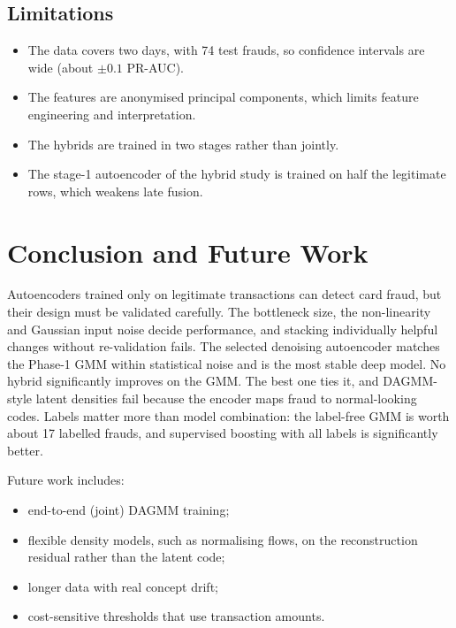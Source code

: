 \documentclass[12pt]{article}
\begin{document}
\subsection{Limitations}
\begin{itemize}
\item The data covers two days, with 74 test frauds, so confidence intervals are wide (about $\pm0.1$ PR-AUC).
\item The features are anonymised principal components, which limits feature engineering and interpretation.
\item The hybrids are trained in two stages rather than jointly.
\item The stage-1 autoencoder of the hybrid study is trained on half the legitimate rows, which weakens late fusion.
\end{itemize}

\section{Conclusion and Future Work}\label{sec:concl}
Autoencoders trained only on legitimate transactions can detect card fraud, but their design must be validated
carefully. The bottleneck size, the non-linearity and Gaussian input noise decide performance, and stacking
individually helpful changes without re-validation fails. The selected denoising autoencoder matches the Phase-1 GMM
within statistical noise and is the most stable deep model. No hybrid significantly improves on the GMM. The best one
ties it, and DAGMM-style latent densities fail because the encoder maps fraud to normal-looking codes. Labels matter more
than model combination: the label-free GMM is worth about 17 labelled frauds, and supervised boosting with all labels
is significantly better.

Future work includes:
\begin{itemize}
\item end-to-end (joint) DAGMM training;
\item flexible density models, such as normalising flows, on the reconstruction residual rather than the latent code;
\item longer data with real concept drift;
\item cost-sensitive thresholds that use transaction amounts.
\end{itemize}



\end{document}
